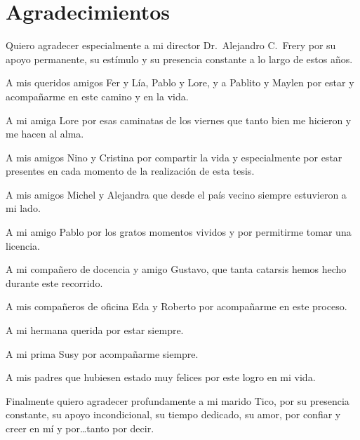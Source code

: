 
\chapter*{Agradecimientos}

Quiero agradecer especialmente a mi director Dr.\ Alejandro C.\ Frery por su apoyo permanente, su estímulo y su presencia constante a lo largo de estos años. 

A mis queridos amigos Fer y Lía, Pablo y Lore, y a Pablito y Maylen por estar y acompañarme en este camino y en la vida.

A mi amiga Lore por esas caminatas de los viernes que tanto bien me hicieron y me hacen al alma.

A mis amigos Nino y Cristina por compartir la vida y especialmente por estar presentes en cada momento de la realización de esta tesis.

A mis amigos Michel y Alejandra que desde el país vecino siempre estuvieron a mi lado.

A mi amigo Pablo por los gratos momentos vividos y por permitirme tomar una licencia.

A mi compañero de docencia y amigo Gustavo, que tanta catarsis hemos hecho durante este recorrido.

A mis compañeros de oficina Eda y Roberto por acompañarme en este proceso. 

A mi hermana querida por estar siempre.

A mi prima Susy por acompañarme siempre.

A mis padres que hubiesen estado muy felices por este logro en mi vida.

Finalmente quiero agradecer profundamente a mi marido Tico, por su presencia constante, su apoyo incondicional, su tiempo dedicado, su amor, por confiar y creer en mí y por\dots tanto por decir.

\newpage
$\ $
\thispagestyle{empty} %
